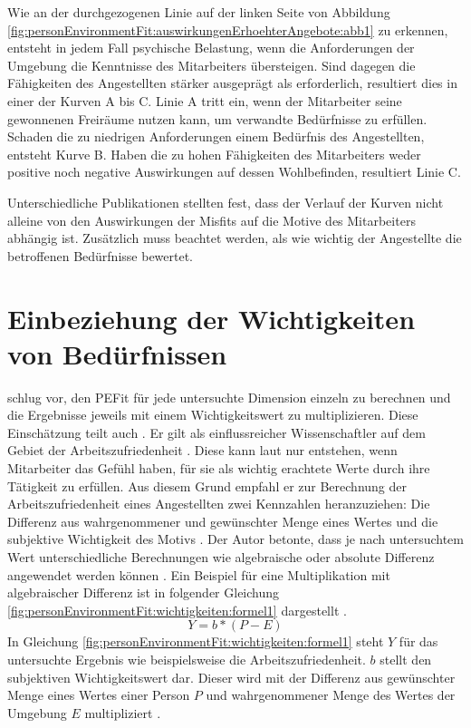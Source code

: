 Wie an der durchgezogenen Linie auf der linken Seite von Abbildung \ref{fig:personEnvironmentFit:auswirkungenErhoehterAngebote:abb1} zu erkennen, entsteht in jedem Fall psychische Belastung, wenn die Anforderungen der Umgebung die Kenntnisse des Mitarbeiters übersteigen. Sind dagegen die Fähigkeiten des Angestellten stärker ausgeprägt als erforderlich, resultiert dies in einer der Kurven A bis C. Linie A tritt ein, wenn der Mitarbeiter seine gewonnenen Freiräume nutzen kann, um verwandte Bedürfnisse zu erfüllen. Schaden die zu niedrigen Anforderungen einem Bedürfnis des Angestellten, entsteht Kurve B. Haben die zu hohen Fähigkeiten des Mitarbeiters weder positive noch negative Auswirkungen auf dessen Wohlbefinden, resultiert Linie C. \cite[S. 22f.]{edwards:2008}\cite[S. 12f.]{harrison:1978}

Unterschiedliche Publikationen stellten fest, dass der Verlauf der Kurven nicht alleine von den Auswirkungen der Misfits auf die Motive des Mitarbeiters abhängig ist. Zusätzlich muss beachtet werden, als wie wichtig der Angestellte die betroffenen Bedürfnisse bewertet. \cite[S. 9f.]{edwards:1996}

\section{Einbeziehung der Wichtigkeiten von Bedürfnissen}
\label{ch:personEnvironmentFit:wichtigkeiten}
\textcite[S. 16]{harrison:1985} schlug vor, den \ac{PEFit} für jede untersuchte Dimension einzeln zu berechnen und die Ergebnisse jeweils mit einem Wichtigkeitswert zu multiplizieren. Diese Einschätzung teilt auch \textcite[S. 8f.]{locke:1976}. Er gilt als einflussreicher Wissenschaftler auf dem Gebiet der Arbeitszufriedenheit \cite[S. 12]{edwards:2008}. Diese kann laut \textcite[S. 8]{locke:1969} nur entstehen, wenn Mitarbeiter das Gefühl haben, für sie als wichtig erachtete Werte durch ihre Tätigkeit zu erfüllen. Aus diesem Grund empfahl er zur Berechnung der Arbeitszufriedenheit eines Angestellten zwei Kennzahlen heranzuziehen: Die Differenz aus wahrgenommener und gewünschter Menge eines Wertes und die subjektive Wichtigkeit des Motivs \cite[S. 8]{locke:1976}. Der Autor betonte, dass je nach untersuchtem Wert unterschiedliche Berechnungen wie algebraische oder absolute Differenz angewendet werden können \cite[S. 13]{edwards:2008}. Ein Beispiel für eine Multiplikation mit algebraischer Differenz ist in folgender Gleichung \ref{fig:personEnvironmentFit:wichtigkeiten:formel1} dargestellt \cite[S. 13]{edwards:2008}.
\begin{equation}
	Y = b * (P - E)
	\label{fig:personEnvironmentFit:wichtigkeiten:formel1}
\end{equation}
In Gleichung \ref{fig:personEnvironmentFit:wichtigkeiten:formel1} steht $Y$ für das untersuchte Ergebnis wie beispielsweise die Arbeitszufriedenheit. $b$ stellt den subjektiven Wichtigkeitswert dar. Dieser wird mit der Differenz aus gewünschter Menge eines Wertes einer Person $P$ und wahrgenommener Menge des Wertes der Umgebung $E$ multipliziert \cite[S. 13]{edwards:2008}.

